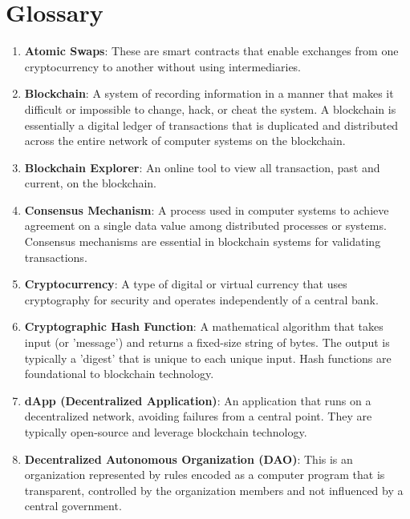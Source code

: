 \section{Glossary}

\begin{enumerate}

    \item \textbf{Atomic Swaps}: These are smart contracts that enable exchanges from one cryptocurrency to another without using intermediaries.

    \item \textbf{Blockchain}: A system of recording information in a manner that makes it difficult or impossible to change, hack, or cheat the system. A blockchain is essentially a digital ledger of transactions that is duplicated and distributed across the entire network of computer systems on the blockchain.

    \item \textbf{Blockchain Explorer}: An online tool to view all transaction, past and current, on the blockchain.

    \item \textbf{Consensus Mechanism}: A process used in computer systems to achieve agreement on a single data value among distributed processes or systems. Consensus mechanisms are essential in blockchain systems for validating transactions.

    \item \textbf{Cryptocurrency}: A type of digital or virtual currency that uses cryptography for security and operates independently of a central bank.

    \item \textbf{Cryptographic Hash Function}: A mathematical algorithm that takes input (or 'message') and returns a fixed-size string of bytes. The output is typically a 'digest' that is unique to each unique input. Hash functions are foundational to blockchain technology.

    \item \textbf{dApp (Decentralized Application)}: An application that runs on a decentralized network, avoiding failures from a central point. They are typically open-source and leverage blockchain technology.

    \item \textbf{Decentralized Autonomous Organization (DAO)}: This is an organization represented by rules encoded as a computer program that is transparent, controlled by the organization members and not influenced by a central government.


\end{enumerate}
